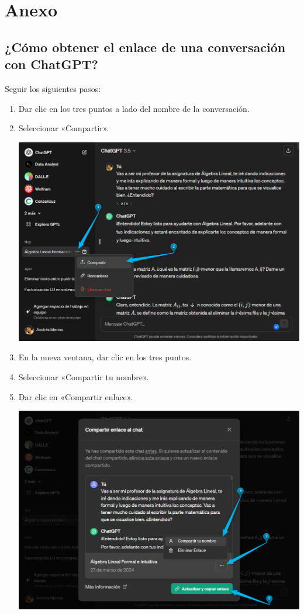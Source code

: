 \documentclass[a4,11pt]{aleph-notas}
\begin{document}
\section*{Anexo}

\subsection*{¿Cómo obtener el enlace de una conversación con ChatGPT?}

Seguir los siguientes pasos:
\begin{enumerate}
    \item Dar clic en los tres puntos a lado del nombre de la conversación.
    \item Seleccionar «Compartir».
    \begin{center}
        \includegraphics[width=0.85\linewidth]{Figuras/fig01.png}
    \end{center}
    \item En la nueva ventana, dar clic en los tres puntos. 
    \item Seleccionar «Compartir tu nombre».
    \item Dar clic en «Compartir enlace».

    \begin{center}
        \includegraphics[width=0.85\linewidth]{Figuras/fig02.png}
    \end{center}
\end{enumerate}
\end{document}
